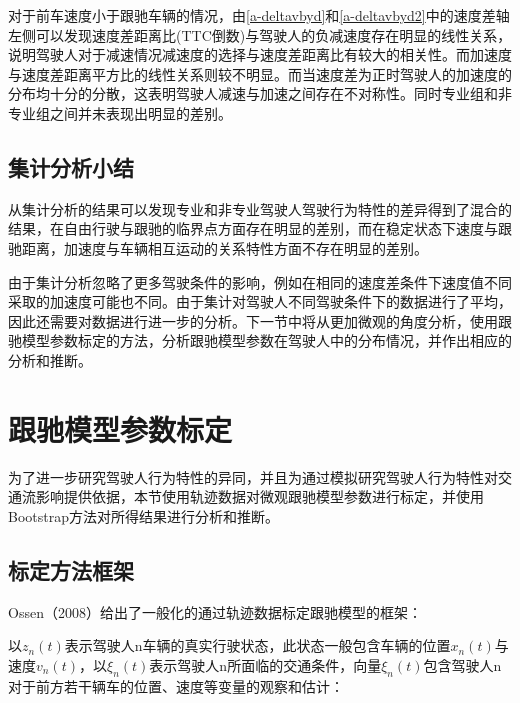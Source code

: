 对于前车速度小于跟驰车辆的情况，由\autoref{a-deltavbyd}和\autoref{a-deltavbyd2}中的速度差轴左侧可以发现速度差距离比(TTC倒数)与驾驶人的负减速度存在明显的线性关系，说明驾驶人对于减速情况减速度的选择与速度差距离比有较大的相关性。而加速度与速度差距离平方比的线性关系则较不明显。而当速度差为正时驾驶人的加速度的分布均十分的分散，这表明驾驶人减速与加速之间存在不对称性。同时专业组和非专业组之间并未表现出明显的差别。


\subsection{集计分析小结}
从集计分析的结果可以发现专业和非专业驾驶人驾驶行为特性的差异得到了混合的结果，在自由行驶与跟驰的临界点方面存在明显的差别，而在稳定状态下速度与跟驰距离，加速度与车辆相互运动的关系特性方面不存在明显的差别。


由于集计分析忽略了更多驾驶条件的影响，例如在相同的速度差条件下速度值不同采取的加速度可能也不同。由于集计对驾驶人不同驾驶条件下的数据进行了平均，因此还需要对数据进行进一步的分析。下一节中将从更加微观的角度分析，使用跟驰模型参数标定的方法，分析跟驰模型参数在驾驶人中的分布情况，并作出相应的分析和推断。










\section{跟驰模型参数标定}
为了进一步研究驾驶人行为特性的异同，并且为通过模拟研究驾驶人行为特性对交通流影响提供依据，本节使用轨迹数据对微观跟驰模型参数进行标定，并使用Bootstrap方法对所得结果进行分析和推断。
\subsection{标定方法框架}
Ossen（2008）\cite{Ossen2008}给出了一般化的通过轨迹数据标定跟驰模型的框架：

以$z_n(t)$表示驾驶人n车辆的真实行驶状态，此状态一般包含车辆的位置$x_n(t)$与速度$v_n(t)$，以$\xi_n(t)$表示驾驶人n所面临的交通条件，向量$\xi_n(t)$包含驾驶人n对于前方若干辆车的位置、速度等变量的观察和估计：

